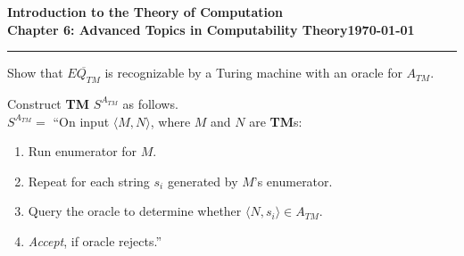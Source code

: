 \documentclass[11pt]{article}
\newcommand{\dated}{\today}
\begin{document}
\textbf{Introduction to the Theory of
Computation}\hfill\textbf{\myname}\\[0.01in]
\textbf{Chapter 6: Advanced Topics in Computability Theory}\hfill\textbf{\dated}\\
\smallskip\hrule\bigskip

\begin{problem}{6.18}
Show that  $\overline{EQ_{TM}}$ is recognizable by a Turing machine with an oracle for $A_{TM}$.
\end{problem}

\begin{solution} Construct \textbf{TM} $S^{A_{TM}}$ as follows. \\

$S^{A_{TM}} =$ \textquotedblleft On input $\langle M, N \rangle$, where $M$ and $N$ are \textbf{TM}s:
\begin{enumerate}
\item Run enumerator for $M$.
\item Repeat for each string $s_i$ generated by $M$'s enumerator.
\item \hspace*{0.5cm} Query the oracle to determine whether $\langle N, s_i \rangle \in A_{TM}$.

\item \hspace*{0.5cm} \textit{Accept}, if oracle rejects.\textquotedblright
\end{enumerate}


\end{solution}
\end{document}
